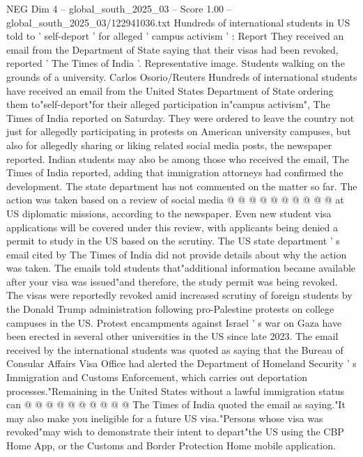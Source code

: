 \begin{textsample}{NEG Dim 4 – global\_south\_2025\_03 – Score 1.00 – global\_south\_2025\_03/122941036.txt}  \label{ex:f4_neg_423}
Hundreds of international students in US told to ' self-deport ' for alleged ' campus activism ' : Report They received an email from the Department of State saying that their visas had been revoked, reported ' The Times of India '.
Representative image.
Students walking on the grounds of a university.
Carlos Osorio/Reuters Hundreds of international students have received an email from the United States Department of State ordering them to"self-deport"for their alleged participation in"campus activism", The Times of India reported on Saturday.
They were ordered to leave the country not just for allegedly participating in protests on American university campuses, but also for allegedly sharing or liking related social media posts, the newspaper reported.
Indian students may also be among those who received the email, The Times of India reported, adding that immigration attorneys had confirmed the development.
The state department has not commented on the matter so far.
The action was taken based on a review of social media @ @ @ @ @ @ @ @ @ @ at US diplomatic missions, according to the newspaper.
Even new student visa applications will be covered under this review, with applicants being denied a permit to study in the US based on the scrutiny.
The US state department ' s email cited by The Times of India did not provide details about why the action was taken.
The emails told students that"additional information became available after your visa was issued"and therefore, the study permit was being revoked.
The visas were reportedly revoked amid increased scrutiny of foreign students by the Donald Trump administration following pro-Palestine protests on college campuses in the US.
Protest encampments against Israel ' s war on Gaza have been erected in several other universities in the US since late 2023.
The email received by the international students was quoted as saying that the Bureau of Consular Affairs Visa Office had alerted the Department of Homeland Security ' s Immigration and Customs Enforcement, which carries out deportation processes."Remaining in the United States without a lawful immigration status can @ @ @ @ @ @ @ @ @ @ The Times of India quoted the email as saying."It may also make you ineligible for a future US visa."Persons whose visa was revoked"may wish to demonstrate their intent to depart"the US using the CBP Home App, or the Customs and Border Protection Home mobile application.

\end{textsample}
